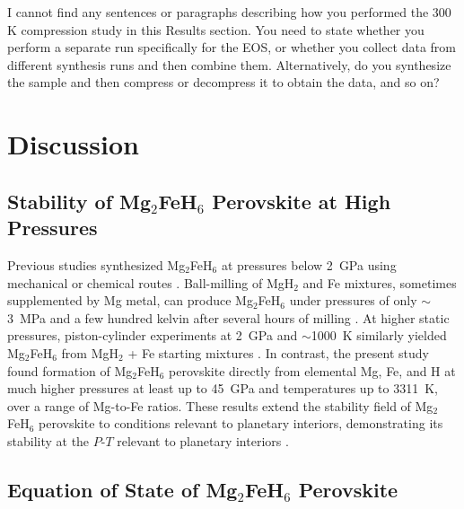 \documentclass[draft,jgrga,12pt]{agujournal2019}
\begin{document}
\begin{cboxr}
I cannot find any sentences or paragraphs describing how you performed the 300 K compression study in this Results section.
You need to state whether you perform a separate run specifically for the EOS, or whether you collect data from different synthesis runs and then combine them. Alternatively, do you synthesize the sample and then compress or decompress it to obtain the data, and so on?
\end{cboxr}

\section{Discussion}

\subsection{Stability of Mg$_2$FeH$_6$ Perovskite at High Pressures}

Previous studies synthesized Mg$_2$FeH$_6$ at pressures below 2~{GPa} using mechanical or chemical routes \cite{george_bulk_2009,polanski_mg2feh6_2019, lang_insitu_2017,retuerto_highpressure_2010, retuerto_neutron_2015}.
Ball-milling of MgH$_2$ and Fe mixtures, sometimes supplemented by Mg metal, can produce Mg$_2$FeH$_6$ under pressures of only $\sim$3~{MPa} and a few hundred kelvin after several hours of milling \cite{george_bulk_2009,polanski_mg2feh6_2019, lang_insitu_2017}.
At higher static pressures, piston-cylinder experiments at 2~GPa and $\sim$1000~K similarly yielded Mg$_2$FeH$_6$ from MgH$_2$ + Fe starting mixtures \cite{retuerto_highpressure_2010, retuerto_neutron_2015}.
In contrast, the present study found formation of Mg$_2$FeH$_6$ perovskite directly from elemental Mg, Fe, and H at much higher pressures at least up to 45~{GPa} and temperatures up to 3311~K, over a range of Mg-to-Fe ratios. 
These results extend the stability field of Mg$_2$FeH$_6$ perovskite to conditions relevant to planetary interiors, demonstrating its stability at the $P$-$T$ relevant to planetary interiors \cite{asselli_formation_2013,puszkiel_new_2018}. 


\subsection{Equation of State of Mg$_2$FeH$_6$ Perovskite}
\end{document}
